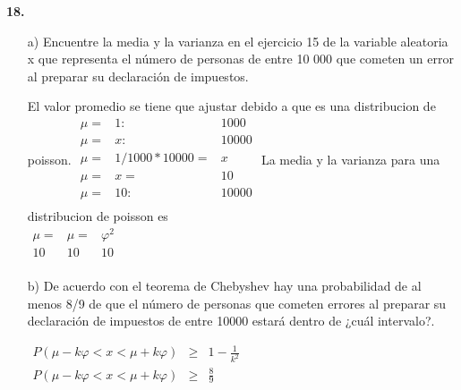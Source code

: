 \documentclass[12pt, letterpaper]{article}
\begin{document}
    \vskip1cm

    \pagebreak
    \textbf{18. }\vskip1cm
    \begin{itemize}
        \item [a)]Encuentre la media  y la varianza en el ejercicio 15  de la variable aleatoria x que representa  el n\'umero de personas  de entre 10 000 que cometen un error al preparar su declaraci\'on de impuestos.
            \begin{center}
                El valor promedio se tiene que ajustar debido a que es una distribucion de poisson.
                \begin{math}
                    \begin{array}{ccc}
                        \mu=&1:&1000\\
                        \mu=&x:&10000\\
                        \mu=&1/1000*10000=&x\\
                        \mu=&x=&10\\
                        \mu=&10:&10000\\
                    \end{array}
                \end{math}
                La media y la varianza para una distribucion de poisson es\\
                \begin{math}
                    \begin{array}{ccc}
                        \mu=&\mu=&\varphi ^2\\
                        10&10&10\\
                    \end{array}
                \end{math}
            \end{center}
        \item[b)]De acuerdo con el teorema de Chebyshev hay una probabilidad de al menos 8/9 de que el n\'umero de personas que cometen errores al preparar su declaraci\'on de impuestos de entre 10000 estar\'a dentro de ¿cu\'al intervalo?.
            \begin{center}
                \begin{math}
                    \begin{array}{ccc}
                        P(\mu-k\varphi<x<\mu+k\varphi)&\geq&1-\displaystyle\frac{1}{k^2}\\
                        P(\mu-k\varphi<x<\mu+k\varphi)&\geq&\displaystyle\frac{8}{9}\\

\end{array}
\end{math}
\end{center}
\end{itemize}
\end{document}

